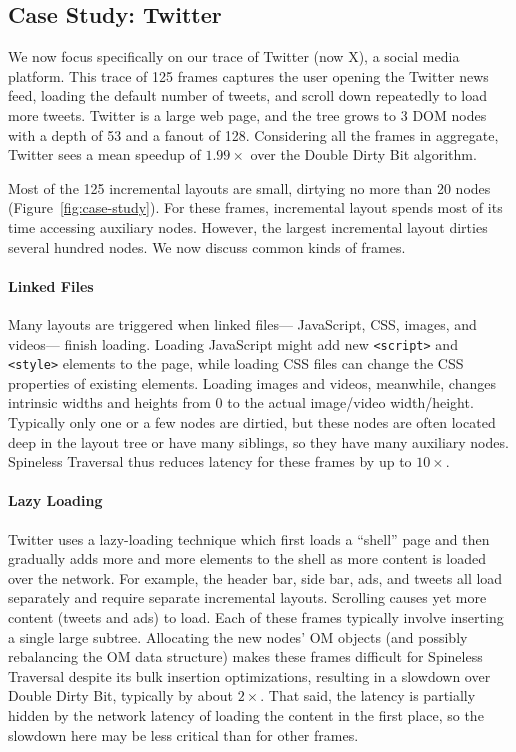 \subsection{Case Study: Twitter}

We now focus specifically
  on our trace of Twitter (now X), a social media platform.
This trace of 125 frames captures the user
  opening the Twitter news feed,
  loading the default number of tweets,
  and scroll down repeatedly to load more tweets.
Twitter is a large web page,
  and the tree grows to 3 DOM nodes
  with a depth of 53 and a fanout of 128. 
Considering all the frames in aggregate,
  Twitter sees a mean speedup of $1.99\times$ 
  over the Double Dirty Bit algorithm.

Most of the 125 incremental layouts are small,
  dirtying no more than 20 nodes (Figure~\ref{fig:case-study}).
For these frames,
  incremental layout spends most of its time
  accessing auxiliary nodes.
However, the largest incremental layout
  dirties several hundred nodes.
We now discuss common kinds of frames.

\paragraph{Linked Files}
Many layouts are triggered when linked files---%
  JavaScript, CSS, images, and videos---%
  finish loading.
Loading JavaScript might add
  new \texttt{<script>} and \texttt{<style>} elements to the page,
  while loading CSS files can change the CSS properties
  of existing elements.
Loading images and videos, meanwhile,
  changes intrinsic widths and heights
  from 0 to the actual image/video width/height.
Typically only one or a few nodes are dirtied,
  but these nodes are often located deep in the layout tree
  or have many siblings,
  so they have many auxiliary nodes.
Spineless Traversal thus reduces latency for these frames
  by up to $10\times$.
 
\paragraph{Lazy Loading}
Twitter uses a lazy-loading technique
  which first loads a ``shell'' page
  and then gradually adds more and more elements to the shell
  as more content is loaded over the network.
For example, the header bar, side bar, ads, and tweets
  all load separately and require separate incremental layouts.
Scrolling causes yet more content (tweets and ads) to load.
Each of these frames typically involve inserting
  a single large subtree.
Allocating the new nodes' OM objects
  (and possibly rebalancing the OM data structure)
  makes these frames difficult for Spineless Traversal
  despite its bulk insertion optimizations,
  resulting in a slowdown over Double Dirty Bit,
  typically by about $2\times$.
That said, the latency
  is partially hidden by the network latency
  of loading the content in the first place,
  so the slowdown here may be less critical
  than for other frames.

